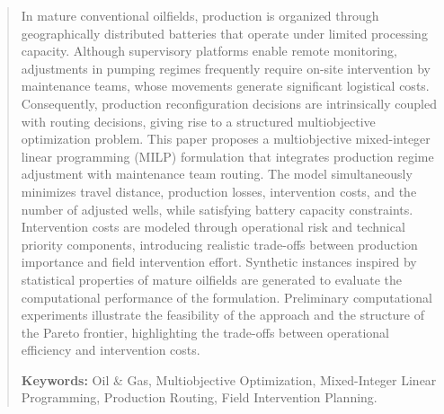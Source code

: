 \documentclass[runningheads, final]{comsis2}
\begin{document}
\begin{abstract}
     In mature conventional oilfields, production is organized through geographically distributed batteries that operate under limited processing capacity. Although supervisory platforms enable remote monitoring, adjustments in pumping regimes frequently require on-site intervention by maintenance teams, whose movements generate significant logistical costs. Consequently, production reconfiguration decisions are intrinsically coupled with routing decisions, giving rise to a structured multiobjective optimization problem. This paper proposes a multiobjective mixed-integer linear programming (MILP) formulation that integrates production regime adjustment with maintenance team routing. The model simultaneously minimizes travel distance, production losses, intervention costs, and the number of adjusted wells, while satisfying battery capacity constraints. Intervention costs are modeled through operational risk and technical priority components, introducing realistic trade-offs between production importance and field intervention effort. Synthetic instances inspired by statistical properties of mature oilfields are generated to evaluate the computational performance of the formulation. Preliminary computational experiments illustrate the feasibility of the approach and the structure of the Pareto frontier, highlighting the trade-offs between operational efficiency and intervention costs.
      
    \vspace{6pt}
    \textbf{Keywords: }
    Oil \& Gas, 
    Multiobjective Optimization, 
    Mixed-Integer Linear Programming, 
    Production Routing, 
    Field Intervention Planning.
\end{abstract}










\end{document}
